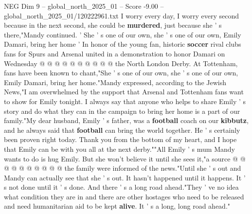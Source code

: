 \begin{textsample}{NEG Dim 9 – global\_north\_2025\_01 – Score -9.00 – global\_north\_2025\_01/120222961.txt}
I worry every day, I worry every second because in the next second, she could be \textbf{murdered}, just because she ' s there,"Mandy continued. ' She ' s one of our own, she ' s one of our own, Emily Damari, bring her home ' In honor of the young fan, historic \textbf{soccer} rival clubs fans for Spurs and Arsenal united in a demonstration to honor Damari on Wednesday @ @ @ @ @ @ @ @ @ @ the North London Derby.
At Tottenham, fans have been known to chant,"She ' s one of our own, she ' s one of our own, Emily Damari, bring her home."Mandy expressed, according to the Jewish News,"I am overwhelmed by the support that Arsenal and Tottenham fans want to show for Emily tonight.
I always say that anyone who helps to share Emily ' s story and do what they can in the campaign to bring her home is a part of our family."My dear husband, Emily ' s father, was a \textbf{football} coach on our \textbf{kibbutz}, and he always said that \textbf{football} can bring the world together.
He ' s certainly been proven right today.
Thank you from the bottom of my heart, and I hope that Emily can be with you all at the next derby.""All Emily ' s mum Mandy wants to do is hug Emily.
But she won't believe it until she sees it,"a source @ @ @ @ @ @ @ @ @ @ the family were informed of the news."Until she ' s out and Mandy can actually see that she ' s out.
It hasn't happened until it happens.
It ' s not done until it ' s done.
And there ' s a long road ahead."They ' ve no idea what condition they are in and there are other hostages who need to be released and need humanitarian aid to be kept \textbf{alive}.
It ' s a long, long road ahead."

\end{textsample}
